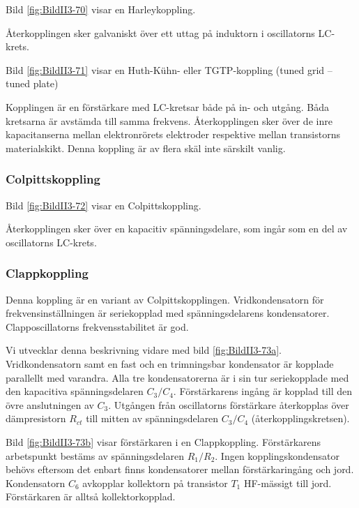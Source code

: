 
Bild \ref{fig:BildII3-70} visar en Harleykoppling.

Återkopplingen sker galvaniskt över ett uttag på induktorn i oscillatorns
LC-krets.

Bild \ref{fig:BildII3-71} visar en Huth-Kühn- eller TGTP-koppling
(tuned grid -- tuned plate)

Kopplingen är en förstärkare med LC-kretsar både på in- och utgång.
Båda kretsarna är avstämda till samma frekvens.
Återkopplingen sker över de inre kapacitanserna mellan elektronrörets elektroder
respektive mellan transistorns materialskikt.
Denna koppling är av flera skäl inte särskilt vanlig.

\subsubsection{Colpittskoppling}

Bild \ref{fig:BildII3-72} visar en Colpittskoppling.

Återkopplingen sker över en kapacitiv spänningsdelare, som ingår som
en del av oscillatorns LC-krets.

\subsubsection{Clappkoppling}

Denna koppling är en variant av Colpittskopplingen.
Vridkondensatorn för frekvensinställningen är seriekopplad med spänningsdelarens
kondensatorer.
Clapposcillatorns frekvensstabilitet är god.

Vi utvecklar denna beskrivning vidare med bild \ref{fig:BildII3-73a}.
Vridkondensatorn samt en fast och en trimningsbar kondensator är kopplade
parallellt med varandra.
Alla tre kondensatorerna är i sin tur seriekopplade med den kapacitiva
spänningsdelaren \(C_3/C_4\).
Förstärkarens ingång är kopplad till den övre anslutningen av \(C_3\).
Utgången från oscillatorns förstärkare återkopplas över dämpresistorn
\(R_{ct}\) till mitten av spänningsdelaren \(C_3/C_4\)
(återkopplingskretsen).

Bild \ref{fig:BildII3-73b} visar förstärkaren i en Clappkoppling.
Förstärkarens arbetspunkt bestäms av spänningsdelaren \(R_1/R_2\).
Ingen kopplingskondensator behövs eftersom det enbart finns kondensatorer
mellan förstärkaringång och jord.
Kondensatorn \(C_6\) avkopplar kollektorn på transistor \(T_1\) HF-mässigt till
jord.
Förstärkaren är alltså kollektorkopplad.

